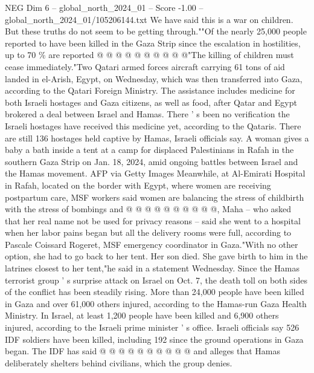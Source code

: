 \begin{textsample}{NEG Dim 6 – global\_north\_2024\_01 – Score -1.00 – global\_north\_2024\_01/105206144.txt}
We have said this is a war on children.
But these truths do not seem to be getting through.""Of the nearly 25,000 people reported to have been killed in the Gaza Strip since the escalation in hostilities, up to 70 \% are reported @ @ @ @ @ @ @ @ @ @"The killing of children must cease immediately."Two Qatari armed forces aircraft carrying 61 tons of aid landed in el-Arish, Egypt, on Wednesday, which was then transferred into Gaza, according to the Qatari Foreign Ministry.
The assistance includes medicine for both Israeli hostages and Gaza citizens, as well as food, after Qatar and Egypt brokered a deal between Israel and Hamas.
There ' s been no verification the Israeli hostages have received this medicine yet, according to the Qataris.
There are still 136 hostages held captive by Hamas, Israeli officials say.
A woman gives a baby a bath inside a tent at a camp for displaced Palestinians in Rafah in the southern Gaza Strip on Jan. 18, 2024, amid ongoing battles between Israel and the Hamas movement.
AFP via Getty Images Meanwhile, at Al-Emirati Hospital in Rafah, located on the border with Egypt, where women are receiving postpartum care, MSF workers said women are balancing the stress of childbirth with the stress of bombings and @ @ @ @ @ @ @ @ @ @, Maha -- who asked that her real name not be used for privacy reasons -- said she went to a hospital when her labor pains began but all the delivery rooms were full, according to Pascale Coissard Rogeret, MSF emergency coordinator in Gaza."With no other option, she had to go back to her tent.
Her son died.
She gave birth to him in the latrines closest to her tent,"he said in a statement Wednesday.
Since the Hamas terrorist group ' s surprise attack on Israel on Oct. 7, the death toll on both sides of the conflict has been steadily rising.
More than 24,000 people have been killed in Gaza and over 61,000 others injured, according to the Hamas-run Gaza Health Ministry.
In Israel, at least 1,200 people have been killed and 6,900 others injured, according to the Israeli prime minister ' s office.
Israeli officials say 526 IDF soldiers have been killed, including 192 since the ground operations in Gaza began.
The IDF has said @ @ @ @ @ @ @ @ @ @ and alleges that Hamas deliberately shelters behind civilians, which the group denies.

\end{textsample}
